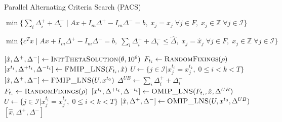 \begin{algorithm}[htbp]
\caption{Parallel Alternating Criteria Search (PACS)}\label{alg:PACS}
\begin{algorithmic}
    \State \Return $\min\{\sum_i \Delta^+_i + \Delta^-_i \mid A x + I_m \Delta^+ - I_m \Delta^- = b, \; x_j = \hat{x}_j \; \forall j \in F, \; x_j \in \mathbb{Z} \; \forall j \in \mathcal{I}\}$
\EndFunction
\end{algorithmic}
\vspace{1em}
\begin{algorithmic}
    \State \Return $\min\{c^T x \mid A x + I_m \Delta^+ - I_m \Delta^- = b, \; \sum_i \Delta^+_i + \Delta^-_i \leq \hat{\Delta}, \; x_j = \hat{x}_j \; \forall j \in F, \; x_j \in \mathbb{Z} \; \forall j \in \mathcal{I}\}$
\EndFunction
\end{algorithmic}
\vspace{1em}
\begin{algorithmic}[1]
\State $[\hat{x}, \Delta^+, \Delta^-] \gets \Call{InitThetaSolution}{\theta,10^6}$
            \State $F_{t_i} \gets \Call{RandomFixings}{\rho}$
            \State $[x^{t_i}, \Delta^{+t_i}, \Delta^{-t_i}] \gets \Call{FMIP\_LNS}{F_{t_i}, \hat{x}}$
        \EndFor
        \State $U \gets \{ j \in \mathcal{I} | x^{t_i}_j = x^{t_k}_j, \; 0 \leq i < k < T\}$
        \State $[\hat{x}, \Delta^+, \Delta^-] \gets \Call{FMIP\_LNS}{U, x^{t_0}}$
    \EndIf
    \State $\Delta^{UB} \gets \sum_i \Delta^+_i + \Delta^-_i$
            \State $F_{t_i} \gets \Call{RandomFixings}{\rho}$
            \State $[x^{t_i}, \Delta^{+t_i}, \Delta^{-t_i}] \gets \Call{OMIP\_LNS}{F_{t_i}, \hat{x}, \Delta^{UB}}$
    \EndFor
    \State $U \gets \{ j \in \mathcal{I} | x^{t_i}_j = x^{t_k}_j, \; 0 \leq i < k < T\}$
    \State $[\hat{x}, \Delta^+, \Delta^-] \gets \Call{OMIP\_LNS}{U, x^{t_0}, \Delta^{UB}}$
\EndWhile
\State \Return $[\hat{x}, \Delta^+, \Delta^-]$
\EndFunction
\end{algorithmic}
\end{algorithm}
